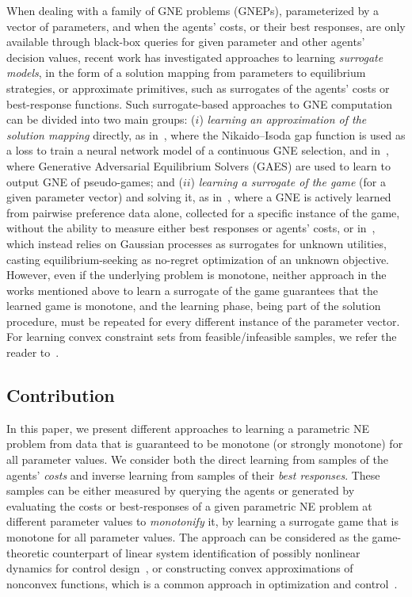 \documentclass[11pt, a4paper]{article}
\theoremstyle{remark}
\theoremstyle{plain}
\begin{document}
When dealing with a family of GNE problems (GNEPs), parameterized by a vector of parameters, and when the agents' costs, or their best responses, are only available through black-box queries for given parameter and other agents' decision values, recent work has investigated approaches to learning {\it surrogate models}, in the form of a solution mapping from parameters to equilibrium strategies, or approximate primitives, such as surrogates of the agents' costs or best-response functions.
Such surrogate-based approaches to GNE computation can be divided into two main groups: ($i$) \emph{learning an approximation of the solution mapping} directly, as in~\cite{BT26}, where the Nikaido--Isoda gap function is used as a loss to train a neural network model of a continuous GNE selection, and in~\cite{goktas2023generative}, where Generative Adversarial Equilibrium Solvers (GAES) are used to learn to output GNE of pseudo-games; and ($ii$) \emph{learning a surrogate of the game} (for a given parameter vector) and solving it, as in~\cite{krupa2026learning}, where a GNE is actively learned from pairwise preference data alone, collected
for a specific instance of the game, without the ability to measure either best responses or agents' costs, or in~\cite{han2024noregret}, which instead relies on Gaussian processes as surrogates for unknown utilities, casting equilibrium-seeking as no-regret optimization of an unknown objective. However, even if the underlying problem is monotone, neither approach in the works mentioned above to learn a surrogate of the game guarantees that the learned game is monotone, and the learning phase, being part of the solution procedure, must be repeated for every
different instance of the parameter vector. For learning convex constraint sets from feasible/infeasible samples, we refer the reader to~\cite{SBB25}.

\subsection{Contribution}
In this paper, we present different approaches to learning a parametric NE problem from data that is guaranteed to be monotone (or strongly monotone) for all parameter values. We 
consider both the direct learning from samples of the agents' {\it costs} and inverse learning from samples of their {\it best responses}. These samples can be either measured by querying the agents or generated by evaluating the costs or best-responses of a given parametric NE problem at different parameter values to {\it monotonify} it, by learning a surrogate game that is monotone
for all parameter values. The approach can be considered as the game-theoretic counterpart of linear system identification of possibly nonlinear dynamics for control design~\cite{Lju99}, or constructing convex approximations of nonconvex functions, which is a common approach in optimization and control~\cite{MSA16,DBS05}.
\end{document}
